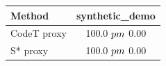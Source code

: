\begin{tabular}{lc}
\toprule
Method & synthetic_demo \\
\midrule
CodeT proxy & 100.0 $\\pm$ 0.00 \\
S* proxy & 100.0 $\\pm$ 0.00 \\
\bottomrule
\end{tabular}
